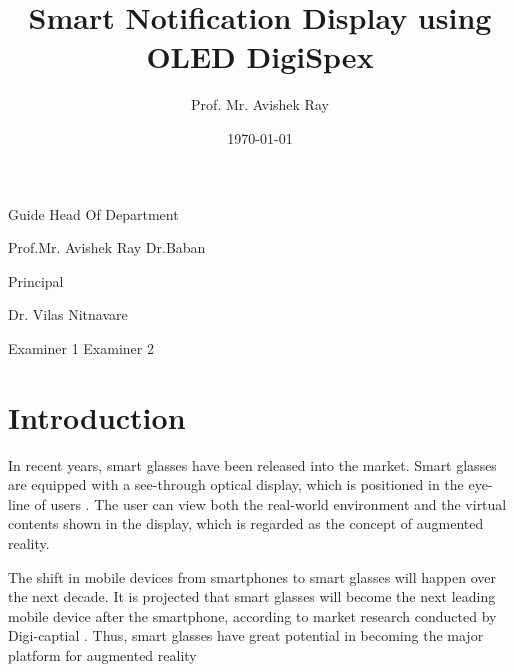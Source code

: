 \documentclass[12pt,a4paper,final,oneside]{report}
\begin{document}
	\begin{flushleft}
		Guide \hspace{95.00mm} Head Of Department\newline
		
		
		
		Prof.Mr. Avishek Ray \hspace{80.00mm}   Dr.Baban
	\end{flushleft}
	
	
	
	\vspace{2cm}
	\begin{center}
		Principal
		
		
		
		Dr. Vilas Nitnavare
	\end{center}
	
	\vspace{2cm}
	\begin{flushleft}
		Examiner 1 \hspace{100.00mm} Examiner 2
	\end{flushleft}
	
	
	
	
	\newpage
	
	\begin{titlepage}
		
		\begin{center}
			\title{Smart Notification Display using OLED DigiSpex}
			\author {Prof. Mr.  Avishek Ray}
			\date{\today} 
		\end{center}
	\end{titlepage}
	
	\tableofcontents
	
	
	
	\chapter{Introduction}
	
	\par In recent years, smart glasses have been released into the market.
	Smart glasses are equipped with a see-through optical display, which is positioned in the eye-line of  users . The  user can view both the real-world environment and the virtual contents shown in the display, which is regarded as the concept of augmented reality.\\
	\vspace{0.5cm}
	\par The shift in mobile devices from smartphones to smart glasses will happen over the next decade. It is projected that smart glasses will become the next leading mobile device after the smartphone, according to market research conducted by Digi-captial . Thus, smart glasses have great potential in becoming the major platform for augmented reality
	
\end{document}
